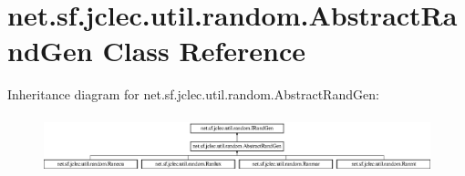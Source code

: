\hypertarget{classnet_1_1sf_1_1jclec_1_1util_1_1random_1_1_abstract_rand_gen}{\section{net.\-sf.\-jclec.\-util.\-random.\-Abstract\-Rand\-Gen Class Reference}
\label{classnet_1_1sf_1_1jclec_1_1util_1_1random_1_1_abstract_rand_gen}
}
Inheritance diagram for net.\-sf.\-jclec.\-util.\-random.\-Abstract\-Rand\-Gen\-:\begin{figure}[H]
\begin{center}
\leavevmode
\includegraphics[height=1.673307cm]{classnet_1_1sf_1_1jclec_1_1util_1_1random_1_1_abstract_rand_gen}
\end{center}
\end{figure}
